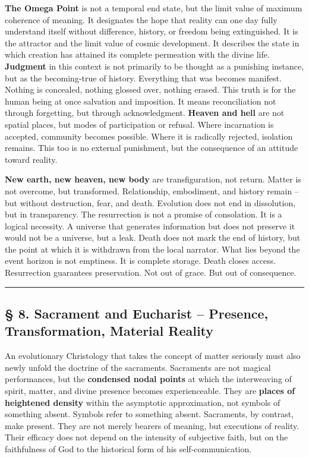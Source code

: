 \documentclass[
  english,
]{article}
\begin{document}
\textbf{The Omega Point} is not a temporal end state, but the limit
value of maximum coherence of meaning. It designates the hope that
reality can one day fully understand itself without difference, history,
or freedom being extinguished. It is the attractor and the limit value
of cosmic development. It describes the state in which creation has
attained its complete permeation with the divine life. \textbf{Judgment}
in this context is not primarily to be thought as a punishing instance,
but as the becoming-true of history. Everything that was becomes
manifest. Nothing is concealed, nothing glossed over, nothing erased.
This truth is for the human being at once salvation and imposition. It
means reconciliation not through forgetting, but through acknowledgment.
\textbf{Heaven and hell} are not spatial places, but modes of
participation or refusal. Where incarnation is accepted, community
becomes possible. Where it is radically rejected, isolation remains.
This too is no external punishment, but the consequence of an attitude
toward reality.

\textbf{New earth, new heaven, new body} are transfiguration, not
return. Matter is not overcome, but transformed. Relationship,
embodiment, and history remain -- but without destruction, fear, and
death. Evolution does not end in dissolution, but in transparency. The
resurrection is not a promise of consolation. It is a logical necessity.
A universe that generates information but does not preserve it would not
be a universe, but a leak. Death does not mark the end of history, but
the point at which it is withdrawn from the local narrator. What lies
beyond the event horizon is not emptiness. It is complete storage. Death
closes access. Resurrection guarantees preservation. Not out of grace.
But out of consequence.

\begin{center}\rule{0.5\linewidth}{0.5pt}\end{center}

\subsection{§ 8. Sacrament and Eucharist -- Presence, Transformation,
Material
Reality}\label{sacrament-and-eucharist-presence-transformation-material-reality}

An evolutionary Christology that takes the concept of matter seriously
must also newly unfold the doctrine of the sacraments. Sacraments are
not magical performances, but the \textbf{condensed nodal points} at
which the interweaving of spirit, matter, and divine presence becomes
experienceable. They are \textbf{places of heightened density} within
the asymptotic approximation, not symbols of something absent. Symbols
refer to something absent. Sacraments, by contrast, make present. They
are not merely bearers of meaning, but executions of reality. Their
efficacy does not depend on the intensity of subjective faith, but on
the faithfulness of God to the historical form of his
self-communication.
\end{document}
